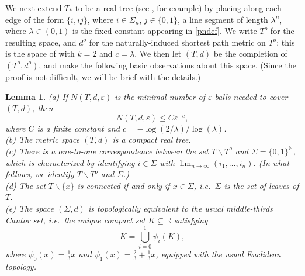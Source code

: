 \documentclass[a4paper, 11pt]{article}
\newtheorem{lem}[theorem]{Lemma}
\begin{document}
We next extend $T_*$ to be a real tree (see \cite[Section 1.1]{AEW}, for example) by placing along each edge of the form $\{i,ij\}$, where $i\in\Sigma_n$, $j\in\{0,1\}$, a line segment of length $\lambda^n$, where $\lambda\in(0,1)$ is the fixed constant appearing in \eqref{pndef}. We write $T^o$ for the resulting space, and $d^o$ for the naturally-induced shortest path metric on $T^o$; this is the space of \cite[Example 1.12]{AEW} with $k=2$ and $c=\lambda$. We then let $(T,d)$ be the completion of $(T^o,d^o)$, and make the following basic observations about this space. (Since the proof is not difficult, we will be brief with the details.)

\begin{lem}\label{props}
(a) If $N(T,d,\varepsilon)$ is the minimal number of $\varepsilon$-balls needed to cover $(T,d)$, then
\[N(T,d,\varepsilon)\leq C\varepsilon^{-c},\]
where $C$ is a finite constant and $c=-\log(2/\lambda)/\log(\lambda)$.\\
(b) The metric space $(T,d)$ is a compact real tree.\\
(c) There is a one-to-one correspondence between the set $T\backslash T^o$ and $\Sigma=\{0,1\}^\mathbb{N}$, which is characterized by identifying $i\in\Sigma$ with $\lim_{n\rightarrow\infty}(i_1,\dots,i_n)$. (In what follows, we identify $T\backslash T^o$ and $\Sigma$.)\\
(d) The set $T\backslash\{x\}$ is connected if and only if $x\in \Sigma$, i.e.\ $\Sigma$ is the set of leaves of $T$.\\
(e) The space $(\Sigma,d)$ is topologically equivalent to the usual middle-thirds Cantor set, i.e.\ the unique compact set $K\subseteq\mathbb{R}$ satisfying
\[K=\bigcup_{i=0}^1\psi_i(K),\]
where $\psi_0(x)=\frac{1}{3}x$ and $\psi_1(x)=\frac{2}{3}+\frac{1}{3}x$, equipped with the usual Euclidean topology.
\end{lem}
\end{document}
